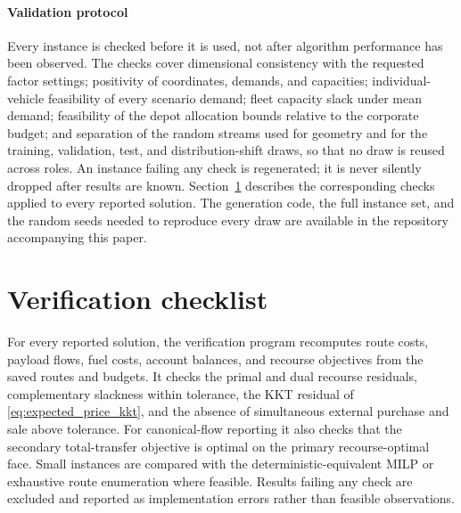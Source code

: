 \documentclass[authoryear,final,3p,times]{elsarticle}
\theoremstyle{definition}
\theoremstyle{plain}
\begin{document}
\paragraph{Validation protocol}
Every instance is checked before it is used, not after algorithm performance has been observed.  The checks cover dimensional consistency with the requested factor settings; positivity of coordinates, demands, and capacities; individual-vehicle feasibility of every scenario demand; fleet capacity slack under mean demand; feasibility of the depot allocation bounds relative to the corporate budget; and separation of the random streams used for geometry and for the training, validation, test, and distribution-shift draws, so that no draw is reused across roles.  An instance failing any check is regenerated; it is never silently dropped after results are known.  Section~\ref{app:verification_checklist} describes the corresponding checks applied to every reported solution.  The generation code, the full instance set, and the random seeds needed to reproduce every draw are available in the repository accompanying this paper.

\section{Verification checklist}
\label{app:verification_checklist}

For every reported solution, the verification program recomputes route costs, payload flows, fuel costs, account balances, and recourse objectives from the saved routes and budgets. It checks the primal and dual recourse residuals, complementary slackness within tolerance, the KKT residual of \eqref{eq:expected_price_kkt}, and the absence of simultaneous external purchase and sale above tolerance.  For canonical-flow reporting it also checks that the secondary total-transfer objective is optimal on the primary recourse-optimal face.  Small instances are compared with the deterministic-equivalent MILP or exhaustive route enumeration where feasible. Results failing any check are excluded and reported as implementation errors rather than feasible observations.



\end{document}
